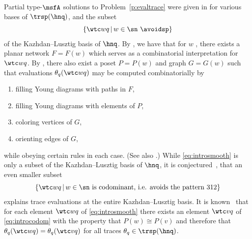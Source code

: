Partial type-$\msfA$ solutions to Problem~\ref{p:evaltrace}
were given in \cite{CHSSkanEKL, SkanCCS}
for various bases of $\trsp(\hnq)$, and
the subset
\begin{equation}\label{eq:introsmooth}
  \{ \wtc wq \,|\, w \in \sn \text{ \avoidsp} \}
\end{equation}
of the Kazhdan--Lusztig basis of $\hnq$.
By \cite[Thm.\,4.3]{SkanNNDCB},
we have that for $w$ \avoidingp, there exists a planar network $F = F(w)$
which serves as a combinatorial interpretation for $\wtc wq$.
By \cite[Thm.\,7.4]{CHSSkanEKL},
there also exist
a poset $P = P(w)$
and graph $G = G(w)$
such that
evaluations $\theta_q( \wtc wq )$ may be computed combinatorially
by
\begin{enumerate}
\item filling Young diagrams with paths in $F$,
\item filling Young diagrams with elements of $P$,
\item coloring vertices of $G$, 
\item orienting edges of $G$,
\end{enumerate}
while obeying certain rules in each case.
(See also \cite{AthanPSE, SWachsChromQF, StanSymm}.)
While \eqref{eq:introsmooth} is only a subset of the Kazhdan--Lusztig basis
of $\hnq$, it is conjectured~\cite[Conj.\,1.9]{ANigroUpdate},
\cite[Conj.\.3.1]{HaimanHecke} that an even smaller subset
\begin{equation}\label{eq:introcodom}
  \{ \wtc wq \,|\, w \in \sn
  \text{ is codominant, i.e. avoids the pattern } 312 \}
\end{equation}
explains trace evaluations at the entire Kazhdan--Lusztig basis.
It is known~\cite[Thm.\,4.6]{CHSSkanEKL}
that for each element $\wtc wq$ of \eqref{eq:introsmooth}
there exists an element $\wtc vq$ of \eqref{eq:introcodom}
with the property that $P(w) \cong P(v)$
and therefore that $\theta_q(\wtc wq) = \theta_q(\wtc vq)$ for all traces
$\theta_q \in \trsp(\hnq)$.

